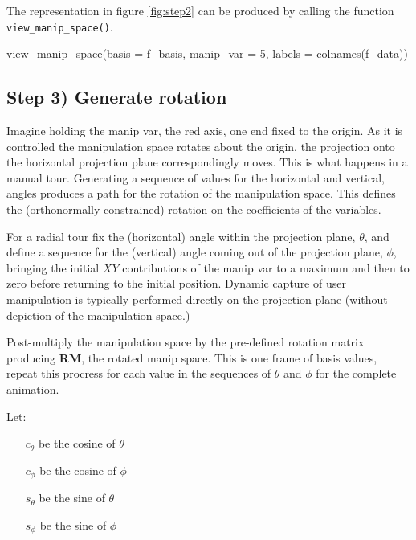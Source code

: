 The representation in figure \ref{fig:step2} can be produced by calling
the function \texttt{view\_manip\_space()}.

\begin{Schunk}
\begin{Sinput}
view_manip_space(basis = f_basis, 
                 manip_var = 5, 
                 labels = colnames(f_data))
\end{Sinput}
\end{Schunk}

\hypertarget{step-3-generate-rotation}{%
\subsection{Step 3) Generate rotation}\label{step-3-generate-rotation}}

Imagine holding the manip var, the red axis, one end fixed to the
origin. As it is controlled the manipulation space rotates about the
origin, the projection onto the horizontal projection plane
correspondingly moves. This is what happens in a manual tour. Generating
a sequence of values for the horizontal and vertical, angles produces a
path for the rotation of the manipulation space. This defines the
(orthonormally-constrained) rotation on the coefficients of the
variables.

For a radial tour fix the (horizontal) angle within the projection
plane, \(\theta\), and define a sequence for the (vertical) angle coming
out of the projection plane, \(\phi\), bringing the initial \(XY\)
contributions of the manip var to a maximum and then to zero before
returning to the initial position. Dynamic capture of user manipulation
is typically performed directly on the projection plane (without
depiction of the manipulation space.)

Post-multiply the manipulation space by the pre-defined rotation matrix
producing \textbf{RM}, the rotated manip space. This is one frame of
basis values, repeat this procress for each value in the sequences of
\(\theta\) and \(\phi\) for the complete animation.

Let:

\begin{itemize}
  \item[$c_\theta$] be the cosine of $\theta$
  \item[$c_\phi$]   be the cosine of $\phi$
  \item[$s_\theta$] be the sine of   $\theta$
  \item[$s_\phi$]   be the sine of   $\phi$
\end{itemize}

